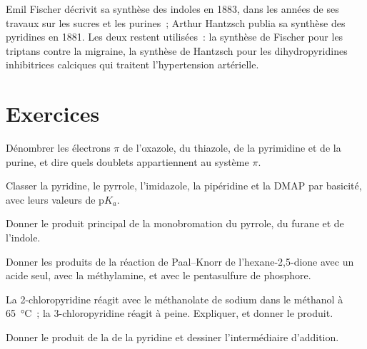 \begin{history}
Emil Fischer décrivit sa synthèse des indoles en 1883, dans les années de
ses travaux sur les sucres et les purines~; Arthur Hantzsch publia sa
synthèse des pyridines en 1881. Les deux restent utilisées~: la synthèse de
Fischer pour les triptans contre la migraine, la synthèse de Hantzsch pour
les dihydropyridines inhibitrices calciques qui traitent l'hypertension
artérielle.
\end{history}

\section{Exercices}

\begin{exercise}[$\star$]\label{exo:b3:heterocycles:1}
Dénombrer les électrons $\pi$ de l'oxazole, du thiazole, de la pyrimidine et de la purine, et dire quels
doublets appartiennent au système $\pi$.
\end{exercise}

\begin{exercise}[$\star$]\label{exo:b3:heterocycles:2}
Classer la pyridine, le pyrrole, l'imidazole, la pipéridine et la DMAP par
basicité, avec leurs valeurs de
$\mathrm pK_a$.
\end{exercise}

\begin{exercise}[$\star$]\label{exo:b3:heterocycles:3}
Donner le produit principal de la monobromation du pyrrole, du furane et de l'indole.
\end{exercise}

\begin{exercise}[$\star$]\label{exo:b3:heterocycles:4}
Donner les produits de la réaction de Paal--Knorr de l'hexane-2,5-dione avec
un acide seul, avec la méthylamine, et avec le pentasulfure de phosphore.
\end{exercise}

\begin{exercise}[$\star\star$]\label{exo:b3:heterocycles:5}
La 2-chloropyridine réagit avec le méthanolate de sodium dans le méthanol à \qty{65}{\celsius}~; la 3-chloropyridine
réagit à peine. Expliquer, et donner le produit.
\end{exercise}

\begin{exercise}[$\star\star$]\label{exo:b3:heterocycles:6}
Donner le produit de la  de la pyridine et
dessiner l'intermédiaire d'addition.
\end{exercise}

